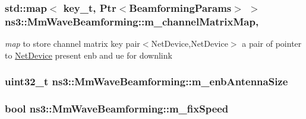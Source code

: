 \subsubsection[{\texorpdfstring{m\+\_\+channel\+Matrix\+Map}{m_channelMatrixMap}}]{\setlength{\rightskip}{0pt plus 5cm}std\+::map$<$ {\bf key\+\_\+t}, {\bf Ptr}$<${\bf Beamforming\+Params}$>$ $>$ ns3\+::\+Mm\+Wave\+Beamforming\+::m\+\_\+channel\+Matrix\+Map\hspace{0.3cm}{\ttfamily [mutable]}, {\ttfamily [private]}}\hypertarget{classns3_1_1MmWaveBeamforming_a934e34478d7bb32f34ed64ef2e66728b}{}\label{classns3_1_1MmWaveBeamforming_a934e34478d7bb32f34ed64ef2e66728b}
{\itshape map} to store channel matrix key pair$<$\+Net\+Device,\+Net\+Device$>$ a pair of pointer to \hyperlink{classns3_1_1NetDevice}{Net\+Device} present enb and ue for downlink 
\subsubsection[{\texorpdfstring{m\+\_\+enb\+Antenna\+Size}{m_enbAntennaSize}}]{\setlength{\rightskip}{0pt plus 5cm}uint32\+\_\+t ns3\+::\+Mm\+Wave\+Beamforming\+::m\+\_\+enb\+Antenna\+Size\hspace{0.3cm}{\ttfamily [private]}}\hypertarget{classns3_1_1MmWaveBeamforming_afd76d851ee841afc56c0f8b7563e2bbc}{}\label{classns3_1_1MmWaveBeamforming_afd76d851ee841afc56c0f8b7563e2bbc}
\subsubsection[{\texorpdfstring{m\+\_\+fix\+Speed}{m_fixSpeed}}]{\setlength{\rightskip}{0pt plus 5cm}bool ns3\+::\+Mm\+Wave\+Beamforming\+::m\+\_\+fix\+Speed\hspace{0.3cm}{\ttfamily [private]}}\hypertarget{classns3_1_1MmWaveBeamforming_aa083011423cd8a3c1077725af8bb7de0}{}\label{classns3_1_1MmWaveBeamforming_aa083011423cd8a3c1077725af8bb7de0}
